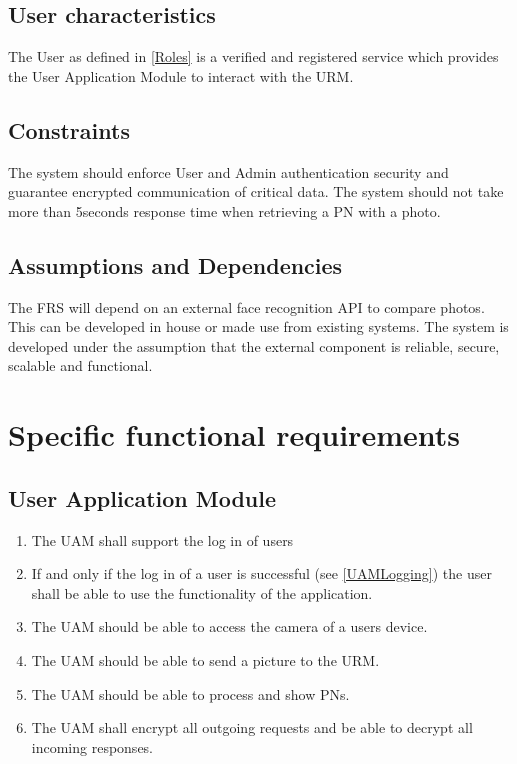 \documentclass[a4paper,11pt]{article}
\begin{document}
\subsection{User characteristics}
The User as defined in \ref{Roles} is a verified and registered service which provides the User Application Module to interact with the URM.

\subsection{Constraints} \label{ReqConstraints}
The system should enforce User and Admin authentication security and guarantee encrypted communication of critical data.
The system should not take more than 5seconds response time when retrieving a PN with a photo.

\subsection{Assumptions and Dependencies}
The FRS will depend on an external face recognition API to compare photos. This can be developed in house or made use from existing systems. The system is developed under the assumption that the external component is reliable, secure, scalable and functional.

\newpage
\section{Specific functional requirements}

\subsection{User Application Module} 
\begin{enumerate}[leftmargin=0.8in]
		\item \label{UAMLogging} The UAM shall support the log in of users
    \item If and only if the log in of a user is successful (see \ref{UAMLogging}) the user shall be able to use the functionality of the application.
		\item \label{UAMCAM} The UAM should be able to access the camera of a users device.
    \item \label{UAMCAM} The UAM should be able to send a picture to the URM.
    \item \label{UAMRet} The UAM should be able to process and show PNs.
		\item The UAM shall encrypt all outgoing requests and be able to decrypt all incoming responses.
\end{enumerate}
\end{document}
